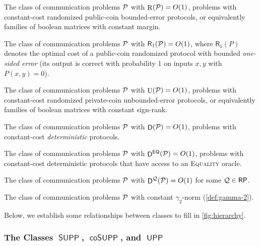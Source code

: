 \documentclass{article}
\DeclareMathOperator{\U}{U}
\DeclareMathOperator{\Rand}{R}
\DeclareMathOperator{\D}{\mathsf{D}}
\newcommand{\cplxclass}[1]{\mathsf{#1}}
\let\P\undefined\DeclareMathOperator{\P}{\cplxclass{P}}
\DeclareMathOperator{\BPP}{\cplxclass{BPP}}
\DeclareMathOperator{\UPP}{\cplxclass{UPP}}
\DeclareMathOperator{\SUPP}{\cplxclass{SUPP}}
\DeclareMathOperator{\coSUPP}{\cplxclass{coSUPP}}
\DeclareMathOperator{\RP}{\cplxclass{RP}}
\newcommand{\EQ}{\mathsf{EQ}}
\begin{document}
\newcommand{\ROne}{\mathsf{R}_1}
\begin{description}[leftmargin=!,labelwidth=1.4cm,labelsep=0.5em]
    \item[$\BPP$:]
    The class of communication problems $\mathcal{P}$ with $\Rand(\cP)
    = O(1)$, \ie problems with constant-cost randomized public-coin
    bounded-error protocols, or equivalently families of boolean matrices with
    constant margin.
    \item[$\RP$:]
    The class of communication problems $\mathcal{P}$ with $\ROne(\cP) = O(1)$,
    where $\ROne(P)$ denotes the optimal cost of a public-coin randomized protocol
    with bounded \emph{one-sided error} (\ie its output is correct with probability 1
    on inputs $x,y$ with $P(x,y) = 0$).
    \item[$\UPP$:]
    The class of communication problems $\mathcal{P}$ with $\U(\cP) =
    O(1)$, \ie problems with constant-cost randomized private-coin
    unbounded-error protocols, or equivalently families of boolean matrices
    with constant sign-rank.
    \item[$\P$:]
    The class of communication problems $\mathcal{P}$ with $\D(\cP) = O(1)$,
    \ie problems with constant-cost \emph{deterministic} protocols.
    \item[$\P^\EQ$:]
    The class of communication problems $\mathcal{P}$ with $\D^\EQ(\cP) = O(1)$,
    \ie problems with constant-cost deterministic protocols that have access to
    an \textsc{Equality} oracle.
    \item[$\P^{\RP}$:]
    The class of communication problems $\mathcal{P}$ with $\D^\cQ(\cP) = O(1)$
    for some $\cQ \in \RP$.
    \item[$\Gamma_2$:]
    The class of communication problems $\mathcal{P}$ with constant $\gamma_2$-norm
    (\cref{def:gamma-2}).
\end{description}

Below, we establish some relationships between classes to fill in \cref{fig:hierarchy}.

\subsubsection{The Classes $\SUPP$, $\coSUPP$, and $\UPP$}
\end{document}
